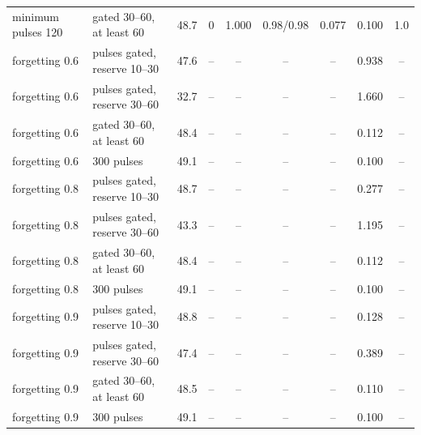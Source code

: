 \begin{table}[htbp]
\begin{tabular*}{\textwidth}{@{\extracolsep{\fill}}llccccccc@{}}
minimum pulses 120 & gated 30--60, at least 60 & 48.7 & 0 & 1.000 & 0.98/0.98 & 0.077 & 0.100 & 1.0 \\
forgetting 0.6 & pulses gated, reserve 10--30 & 47.6 & -- & -- & -- & -- & 0.938 & -- \\
forgetting 0.6 & pulses gated, reserve 30--60 & 32.7 & -- & -- & -- & -- & 1.660 & -- \\
forgetting 0.6 & gated 30--60, at least 60 & 48.4 & -- & -- & -- & -- & 0.112 & -- \\
forgetting 0.6 & 300 pulses & 49.1 & -- & -- & -- & -- & 0.100 & -- \\
forgetting 0.8 & pulses gated, reserve 10--30 & 48.7 & -- & -- & -- & -- & 0.277 & -- \\
forgetting 0.8 & pulses gated, reserve 30--60 & 43.3 & -- & -- & -- & -- & 1.195 & -- \\
forgetting 0.8 & gated 30--60, at least 60 & 48.4 & -- & -- & -- & -- & 0.112 & -- \\
forgetting 0.8 & 300 pulses & 49.1 & -- & -- & -- & -- & 0.100 & -- \\
forgetting 0.9 & pulses gated, reserve 10--30 & 48.8 & -- & -- & -- & -- & 0.128 & -- \\
forgetting 0.9 & pulses gated, reserve 30--60 & 47.4 & -- & -- & -- & -- & 0.389 & -- \\
forgetting 0.9 & gated 30--60, at least 60 & 48.5 & -- & -- & -- & -- & 0.110 & -- \\
forgetting 0.9 & 300 pulses & 49.1 & -- & -- & -- & -- & 0.100 & -- \\
\bottomrule
\end{tabular*}
\end{table}
